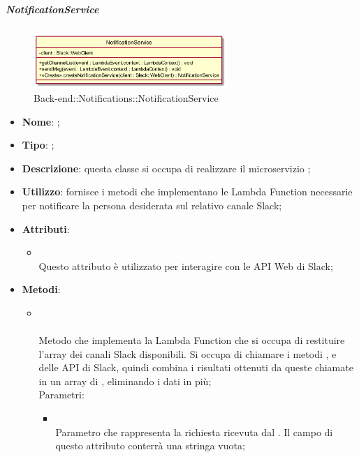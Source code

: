 \hypertarget{NotificationService_label}{\subparagraph{NotificationService}}
\begin{figure}[h]
	\centering
	\includegraphics[width=0.65\textwidth,height=\textheight,keepaspectratio]{images/ClassNotificationService.png}
	\caption{Back-end::Notifications::NotificationService}
\end{figure}
\begin{itemize}
	\item \textbf{Nome}: ;
	\item \textbf{Tipo}: ;
	\item \textbf{Descrizione}: questa classe si occupa di realizzare il microservizio ;
	\item \textbf{Utilizzo}: fornisce i metodi che implementano le Lambda Function necessarie per notificare la persona desiderata sul relativo canale Slack;
	\item \textbf{Attributi}:
	\begin{itemize}
		\item[]  \\
		Questo attributo è utilizzato per interagire con le API Web di Slack;
	\end{itemize}
	\item \textbf{Metodi}:
	\begin{itemize}
		\item[] \\ \\		Metodo che implementa la Lambda Function che si occupa di restituire l'array dei canali Slack disponibili. Si occupa di chiamare i metodi ,  e  delle API di Slack, quindi combina i risultati ottenuti da queste chiamate in un array di , eliminando i dati in più;\\
		Parametri:
		\begin{itemize}
			\item {} \\
			Parametro che rappresenta la richiesta ricevuta dal . Il campo  di questo attributo conterrà una stringa vuota;

\end{itemize}
\end{itemize}
\end{itemize}
